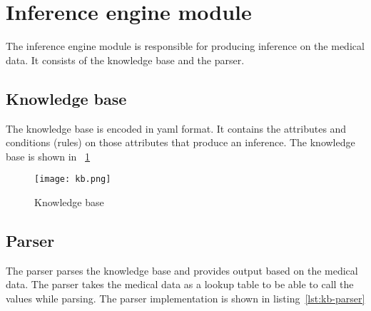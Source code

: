 \section{Inference engine module}
The inference engine module is responsible for producing inference on the medical data. It consists of the knowledge base and the parser.

\subsection{Knowledge base}
The knowledge base is encoded in yaml format. It contains the attributes and conditions (rules) on those attributes that produce an inference. The knowledge base is shown in \figurename~\ref{fig:kb}

\begin{figure}[htb]
	\centering
	\texttt{[image: kb.png]}
	\caption{Knowledge base}
	\label{fig:kb}
\end{figure}

\subsection{Parser}
The parser parses the knowledge base and provides output based on the medical data. The parser takes the medical data as a lookup table to be able to call the values while parsing. The parser implementation is shown in listing~\ref{lst:kb-parser}

